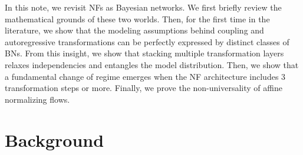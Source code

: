 In this note, we revisit NFs as Bayesian networks.
We first briefly review the mathematical grounds of these two worlds. Then, for the first time in the literature, we show that the modeling assumptions behind coupling and autoregressive transformations can be perfectly expressed by distinct classes of BNs.
From this insight, we show that stacking multiple transformation layers relaxes independencies and entangles the model distribution.
Then, we show that a fundamental change of regime emerges when the NF architecture includes 3 transformation steps or more.
Finally, we prove the non-universality of affine normalizing flows.


\section{Background}
